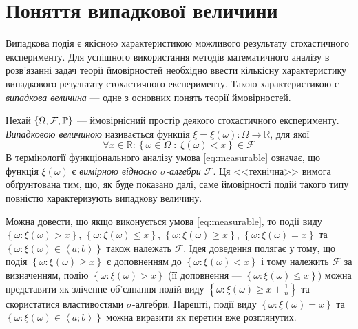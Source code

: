 
\section{Поняття випадкової величини}
Випадкова подія є якісною характеристикою можливого результату стохастичного експерименту.
Для успішного використання методів математичного аналізу в розв'язанні задач теорії ймовірностей
необхідно ввести кількісну характеристику випадкового результату стохастичного експерименту.
Такою характеристикою є \emph{випадкова величина} --- одне з основних понять теорії ймовірностей.
\begin{definition}\label{def:random_variable}
    Нехай $\left\{\Omega, \mathcal{F}, \P \right\}$ --- ймовірнісний простір деякого стохастичного експерименту.
    \emph{Випадковою величиною} називається функція $\xi = \xi(\omega): \Omega 
    \rightarrow \mathbb{R}$, для якої 
    \begin{equation}\label{eq:measurable}
        \forall x \in \mathbb{R}:
        \left\{ \omega \in \Omega\; :\; \xi(\omega) < x\right\} \in \mathcal{F}
    \end{equation} 
    В термінології функціонального аналізу умова \eqref{eq:measurable} означає, що функція $\xi(\omega)$ є
    \emph{вимірною відносно $\sigma$-алгебри $\mathcal{F}$}. Ця <<технічна>> вимога обґрунтована тим,
    що, як буде показано далі, саме ймовірності подій такого типу повністю характеризують випадкову величину.
\end{definition}
\begin{remark}
    Можна довести, що якщо виконується умова \eqref{eq:measurable}, то події виду
    $\left\{ \omega: \xi(\omega) > x\right\}$, $\left\{ \omega: \xi(\omega) \leq x\right\}$,
    $\left\{ \omega: \xi(\omega) \geq x\right\}$, $\left\{ \omega: \xi(\omega) = x\right\}$ та
    $\left\{ \omega: \xi(\omega) \in \left< a; b\right> \right\}$ також належать $\mathcal{F}$.
    Ідея доведення полягає у тому, що подія $\left\{ \omega: \xi(\omega) \geq x\right\}$ є
    доповненням до $\left\{ \omega: \xi(\omega) < x\right\}$ і тому належить $\mathcal{F}$
    за визначенням, подію $\left\{ \omega: \xi(\omega) > x\right\}$ (її доповнення --- 
    $\left\{ \omega: \xi(\omega) \leq x\right\}$) можна представити
    як зліченне об'єднання подій виду $\left\{ \omega: \xi(\omega) \geq x + \frac{1}{n}\right\}$
    та скористатися властивостями $\sigma$-алгебри.
    Нарешті, події виду $\left\{ \omega: \xi(\omega) = x\right\}$ та
    $\left\{ \omega: \xi(\omega) \in \left< a; b\right> \right\}$
    можна виразити як перетин вже розглянутих.
\end{remark}

